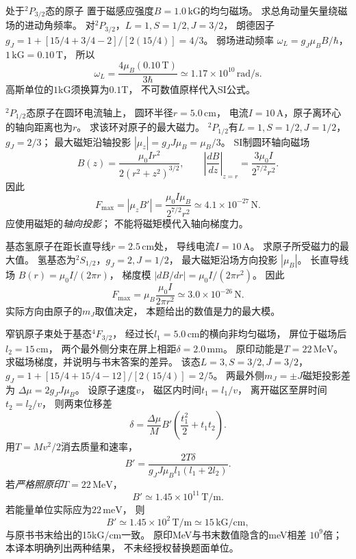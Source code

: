 处于\({}^{2}P_{3/2}\)态的原子
置于磁感应强度$B=1.0\,\mathrm{kG}$的均匀磁场。
求总角动量矢量绕磁场的进动角频率。
\exsolution
对\({}^{2}P_{3/2}\)，$L=1,S=1/2,J=3/2$，
朗德因子
$g_J=1+[15/4+3/4-2]/[2(15/4)]=4/3$。
弱场进动频率
$\omega_L=g_J\mu_B B/\hbar$，
$1\,\mathrm{kG}=0.10\,\mathrm T$，
所以
\[
 \boxed{\omega_L=
 \frac{4\mu_B(0.10\,\mathrm T)}{3\hbar}
 \simeq1.17\times10^{10}\,\mathrm{rad/s}}.
\]
\excheck 高斯单位的$1$kG须换算为$0.1$T，
不可数值原样代入SI公式。

\({}^{2}P_{1/2}\)态原子在圆环电流轴上，
圆环半径$r=5.0\,\mathrm{cm}$，
电流$I=10\,\mathrm A$，原子离环心的轴向距离也为$r$。
求该环对原子的最大磁力。
\exsolution
\({}^{2}P_{1/2}\)有$L=1,S=1/2,J=1/2$，
$g_J=2/3$；
最大磁矩沿轴投影
$|\mu_z|=g_JJ\mu_B=\mu_B/3$。
SI制圆环轴向磁场
\[
 B(z)=\frac{\mu_0Ir^2}{2(r^2+z^2)^{3/2}},
 \qquad
 \left|\frac{dB}{dz}\right|_{z=r}
 =\frac{3\mu_0I}{2^{7/2}r^2}.
\]
因此
\[
 \boxed{F_{\max}=|\mu_z B'|
 =\frac{\mu_0I\mu_B}{2^{7/2}r^2}
 \simeq4.1\times10^{-27}\,\mathrm N}.
\]
\excheck 应使用磁矩的\emph{轴向投影}；
不能将磁矩模代入轴向梯度力。

基态氢原子在距长直导线$r=2.5\,\mathrm{cm}$处，
导线电流$I=10\,\mathrm A$。
求原子所受磁力的最大值。
\exsolution
氢基态为\({}^{2}S_{1/2}\)，$g_J=2,J=1/2$，
最大磁矩沿场方向投影
$|\mu_B|$。
长直导线场
$B(r)=\mu_0I/(2\pi r)$，
梯度模
$|dB/dr|=\mu_0I/(2\pi r^2)$。
因此
\[
 \boxed{F_{\max}=\mu_B\frac{\mu_0 I}{2\pi r^2}
 \simeq3.0\times10^{-26}\,\mathrm N}.
\]
\excheck 实际方向由原子的$m_J$取值决定，
本题给出的数值是力的最大模。

窄钒原子束处于基态\({}^{4}F_{3/2}\)，
经过长$l_1=5.0\,\mathrm{cm}$的横向非均匀磁场，
屏位于磁场后$l_2=15\,\mathrm{cm}$，
两个最外侧分束在屏上相距$\delta=2.0\,\mathrm{mm}$。
原印动能是$T=22\,\mathrm{MeV}$。
求磁场梯度，并说明与书末答案的差异。
\exsolution
该态$L=3,S=3/2,J=3/2$，
$g_J=1+[15/4+15/4-12]/[2(15/4)]=2/5$。
两最外侧$m_J=\pm J$磁矩投影差为
$\Delta\mu=2g_JJ\mu_B$。
设原子速度$v$，
磁区内时间$t_1=l_1/v$，
离开磁区至屏时间$t_2=l_2/v$，
则两束位移差
\[
 \delta=\frac{\Delta\mu}{M}B'
 \left(\frac{t_1^2}2+t_1t_2\right).
\]
用$T=Mv^2/2$消去质量和速率，
\[
 \boxed{B'=\frac{2T\delta}
 {g_JJ\mu_B l_1(l_1+2l_2)}}.
\]
若\emph{严格照原印}$T=22\,\mathrm{MeV}$，
\[
 \boxed{B'\simeq1.45\times10^{11}\,\mathrm{T/m}}.
\]
若能量单位实际应为$22\,\mathrm{meV}$，
则
\[
 \boxed{B'\simeq1.45\times10^2\,\mathrm{T/m}
 \simeq15\,\mathrm{kG/cm}},
\]
与原书书末给出的15kG/cm一致。
\excheck 原印MeV与书末数值隐含的meV相差
$10^9$倍；本译本明确列出两种结果，
不未经授权替换题面单位。

